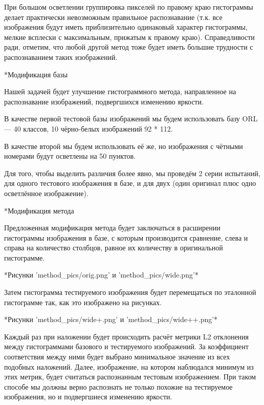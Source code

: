 \documentclass[a4paper,12pt,titlpage]{posobie}
\makeatletter
\renewcommand{\subsection}{\@startsection{subsection}{2}{0.0cm}{0.3cm}{0.1cm}%
             {\fontsize{14}{16}\bf\selectfont }}
\makeatother
\begin{document}
При большом осветлении группировка пикселей по правому краю гистограммы делает практически невозможным правильное распознавание (т.к. все изображения будут иметь приблизительно одинаковый характер гистограммы, мелкие всплески с максимальным, прижатым к правому краю). Справедливости ради, отметим, что любой другой метод тоже будет иметь большие трудности с распознаванием таких изображений. 

\subsection*{Модификация базы}

Нашей задачей будет улучшение гистограммного метода, направленное на распознавание изображений, подвергшихся изменению яркости. 

В качестве первой тестовой базы изображений мы будем использовать базу ORL — 40 классов, 10 чёрно-белых изображений 92 * 112.

В качестве второй мы будем использовать её же, но изображения с чётными номерами будут осветлены на 50 пунктов.

Для того, чтобы выделить различия более явно, мы проведём 2 серии испытаний, для одного тестового изображения в базе, 
и для двух (один оригинал плюс одно осветлённое изображение).

\subsection*{Модификация метода}

Предложенная модификация метода будет заключаться в расширении гистограммы изображения в базе, с которым производится сравнение, слева и справа на количество столбцов, равное их количеству в оригинальной гистограмме. 

*Рисунки 'method_pics/orig.png' и 'method_pics/wide.png'*

Затем гистограмма тестируемого изображения будет перемещаться по эталонной гистограмме так, как это изображено на рисунках.

*Рисунки 'method_pics/wide+.png' и 'method_pics/wide++.png'*

Каждый раз при наложении будет происходить расчёт метрики L2 отклонения между гистограммами базового и тестируемого изображений. За коэффициент соответствия между ними будет выбрано минимальное значение из всех подобных наложений. Далее, изображение, на котором наблюдался минимум из этих метрик, будет считаться распознанным тестовым изображением. При таком способе мы должны верно распознать не только похожие на тестируемое изображения, но и подвергшиеся изменению яркости.
\end{document}
